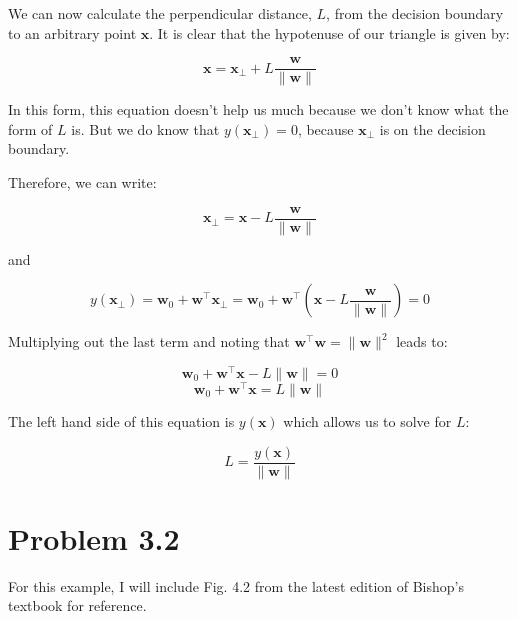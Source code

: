 \documentclass[12pt, letterpaper]{article}
\begin{document}
We can now calculate the perpendicular distance, $L$, from the decision boundary to an arbitrary point $\mathbf{x}$. It is clear that the hypotenuse of our triangle is given by:

\begin{equation}
\mathbf{x}=\mathbf{x}_{\perp}+L \frac{\mathbf{w}}{\|\mathbf{w}\|}
\end{equation}

In this form, this equation doesn't help us much because we don't know what the form of $L$ is. But we do know that $y(\mathbf{x}_{\perp}) = 0$, because $\mathbf{x}_{\perp}$ is on the decision boundary. 

Therefore, we can write:

\begin{equation}
\mathbf{x}_{\perp} = \mathbf{x} - L \frac{\mathbf{w}}{\|\mathbf{w}\|}
\end{equation}

and 

\begin{equation}
y(\mathbf{x}_{\perp}) = \mathbf{w}_{0}+\mathbf{w}^{\top} \mathbf{x}_{\perp} = \mathbf{w}_{0}+\mathbf{w}^{\top} (\mathbf{x} - L \frac{\mathbf{w}}{\|\mathbf{w}\|}) = 0
\end{equation}

Multiplying out the last term and noting that $\mathbf{w}^{\top} \mathbf{w} = \|\mathbf{w}\|^2$ leads to:

\begin{equation}
\mathbf{w}_{0}+\mathbf{w}^{\top} \mathbf{x} - L \|\mathbf{w}\| = 0
\end{equation}
\begin{equation}
\mathbf{w}_{0}+\mathbf{w}^{\top} \mathbf{x} = L \|\mathbf{w}\|
\end{equation}

The left hand side of this equation is $y(\mathbf{x})$ which allows us to solve for $L$:

\begin{equation}
L = \frac{y(\mathbf{x})}{\|\mathbf{w}\|}
\end{equation}

\section*{Problem 3.2}

For this example, I will include Fig. 4.2 from the latest edition of Bishop's textbook for reference. 
\end{document}
